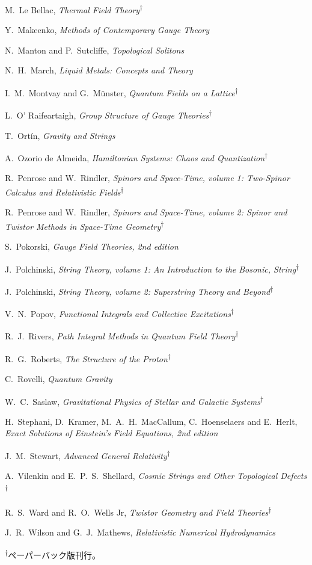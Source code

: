\begin{list}{}{\setlength{\leftmargin}{0pt}\setlength{\rightmargin}{0pt}
\setlength{\itemsep}{2pt}\setlength{\parsep}{0pt}}
\item M.~Le Bellac, \emph{Thermal Field Theory}\textsuperscript{\(\dagger\)}
\item Y.~Makeenko, \emph{Methods of Contemporary Gauge Theory}
\item N.~Manton and P.~Sutcliffe, \emph{Topological Solitons}
\item N.~H.~March, \emph{Liquid Metals: Concepts and Theory}
\item I.~M.~Montvay and G.~Münster, \emph{Quantum Fields on a Lattice}\textsuperscript{\(\dagger\)}
\item L.~O' Raifeartaigh, \emph{Group Structure of Gauge Theories}\textsuperscript{\(\dagger\)}
\item T.~Ortín, \emph{Gravity and Strings}
\item A.~Ozorio de Almeida, \emph{Hamiltonian Systems: Chaos and Quantization}\textsuperscript{\(\dagger\)}
\item R.~Penrose and W.~Rindler, \emph{Spinors and Space-Time, volume 1: Two-Spinor Calculus and Relativistic Fields}\textsuperscript{\(\dagger\)}
\item R.~Penrose and W.~Rindler, \emph{Spinors and Space-Time, volume 2: Spinor and Twistor Methods in Space-Time Geometry}\textsuperscript{\(\dagger\)}
\item S.~Pokorski, \emph{Gauge Field Theories, 2nd edition}
\item J.~Polchinski, \emph{String Theory, volume 1: An Introduction to the Bosonic, String}\textsuperscript{\(\dagger\)}
\item J.~Polchinski, \emph{String Theory, volume 2: Superstring Theory and Beyond}\textsuperscript{\(\dagger\)}
\item V.~N.~Popov, \emph{Functional Integrals and Collective Excitations}\textsuperscript{\(\dagger\)}
\item R.~J.~Rivers, \emph{Path Integral Methods in Quantum Field Theory}\textsuperscript{\(\dagger\)}
\item R.~G.~Roberts, \emph{The Structure of the Proton}\textsuperscript{\(\dagger\)}
\item C.~Rovelli, \emph{Quantum Gravity}
\item W.~C.~Saslaw, \emph{Gravitational Physics of Stellar and Galactic Systems}\textsuperscript{\(\dagger\)}
\item H.~Stephani, D.~Kramer, M.~A.~H.~MacCallum, C.~Hoenselaers and E.~Herlt, \emph{Exact Solutions of Einstein's Field Equations, 2nd edition}
\item J.~M.~Stewart, \emph{Advanced General Relativity}\textsuperscript{\(\dagger\)}
\item A.~Vilenkin and E.~P.~S.~Shellard, \emph{Cosmic Strings and Other Topological Defects}\textsuperscript{\(\dagger\)}
\item R.~S.~Ward and R.~O.~Wells Jr, \emph{Twistor Geometry and Field Theories}\textsuperscript{\(\dagger\)}
\item J.~R.~Wilson and G.~J.~Mathews, \emph{Relativistic Numerical Hydrodynamics}
\end{list}
\noindent \textsuperscript{\(\dagger\)}ペーパーバック版刊行。
\endgroup

